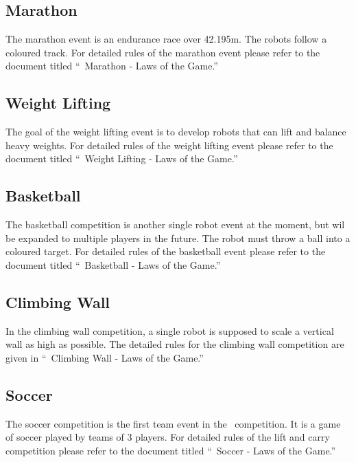 \documentclass[12pt]{hurocup}
\begin{document}
\subsection{Marathon}
\label{subsec:marathon}

The marathon event is an endurance race over 42.195m. The robots
follow a coloured track. For detailed rules of the marathon event
please refer to the document titled ``\HuroCup\ Marathon - Laws of the
Game.''

\subsection{Weight Lifting}
\label{subsec:weight-lifting}

The goal of the weight lifting event is to develop robots that can
lift and balance heavy weights. For detailed rules of the weight
lifting event please refer to the document titled ``\HuroCup\ Weight
Lifting - Laws of the Game.''

\subsection{Basketball}
\label{subsec:basketball}

The basketball competition is another single robot event at the
moment, but wil be expanded to multiple players in the future. The
robot must throw a ball into a coloured target. For detailed rules of
the basketball event please refer to the document titled ``\HuroCup\
Basketball - Laws of the Game.''

\subsection{Climbing Wall}
\label{subsec:climbing-wall}

In the climbing wall competition, a single robot is supposed to scale
a vertical wall as high as possible. The detailed rules for the
climbing wall competition are given in ``\HuroCup\ Climbing Wall - Laws
of the Game.''

\subsection{Soccer}
\label{subsec:soccer}

The soccer competition is the first team event in the \HuroCup\
competition. It is a game of soccer played by teams of 3 players. For
detailed rules of the lift and carry competition please refer to the
document titled ``\HuroCup\ Soccer - Laws of the Game.''
\end{document}
